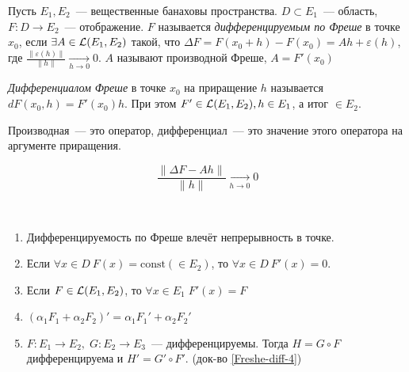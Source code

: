 
\begin{definition}
    Пусть $E_1, E_2$~--- вещественные банаховы пространства. $D \subset E_1$~--- область, $F\!: D \to E_2$~--- отображение. $F$ называется \textit{дифференцируемым по Фреше} в точке $x_0$, 
    если \newline  $\exists A \in \mathcal{L}(E_1, E_2)$ такой, что $\Delta F = F(x_0 + h) - F(x_0) = A h + \varepsilon(h)$, где $\frac{\|\varepsilon(h) \|}{\|h\|} \xrightarrow[h \to 0]{} 0$. \newline $A$ называют производной Фреше, $A = F'(x_0)$
\end{definition}

\begin{definition}
    \textit{Дифференциалом Фреше} в точке $x_0$ на приращение $h$ называется 
    $dF(x_0, h) = F'(x_0) h$. При этом $F' \in \mathcal{L}(E_1, E_2), h \in E_1$, а итог $\in E_2$.
\end{definition}

\begin{lemmanote}
    Производная~--- это оператор, дифференциал~--- это значение этого оператора на аргументе приращения.
\end{lemmanote}

\begin{definition}
    \[
    \frac{\|\Delta F - Ah\|}{\|h\|} \xrightarrow[h \to 0]{} 0
    \]
\end{definition}

\begin{statement}\(\)
    \begin{enumerate}
        \item[0.]  Дифференцируемость по Фреше влечёт непрерывность в точке.
        \item[1.] Если $\forall x \in D\:F(x) = \text{const} (\in E_2)$, то $\forall x \in D \: F'(x) = 0$.
        \item[2.] Если $F \in \mathcal{L}(E_1,E_2)$, то $\forall x \in E_1 \; F'(x)=F$
        \item[3.] $(\alpha_1 F_1 + \alpha_2 F_2)'=\alpha_1 F_1' + \alpha_2 F_2'$
        \item[4.] $F\!\!: E_1 \to E_2, \; G\!\!: E_2 \to E_3$~--- дифференцируемы. 
        Тогда $H = G \circ F$ дифференцируема и $H' = G' \circ F'$. (док-во \ref{Freshe-diff-4})
    \end{enumerate}
\end{statement}

